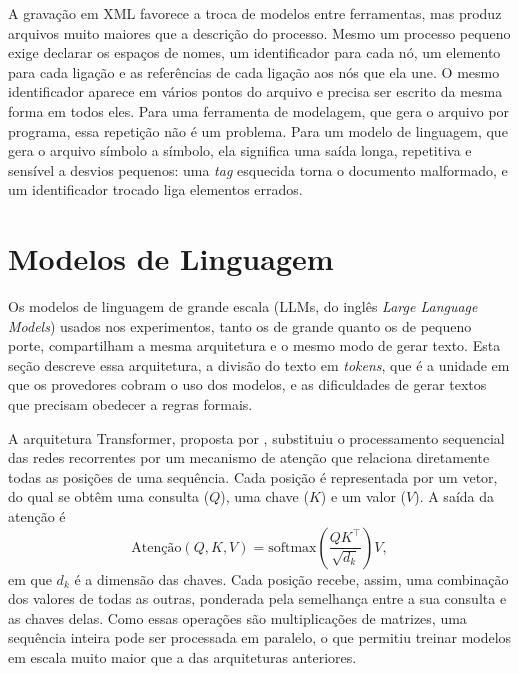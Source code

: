 A gravação em XML favorece a troca de modelos entre ferramentas, mas produz arquivos muito maiores que a descrição do processo. Mesmo um processo pequeno exige declarar os espaços de nomes, um identificador para cada nó, um elemento para cada ligação e as referências de cada ligação aos nós que ela une. O mesmo identificador aparece em vários pontos do arquivo e precisa ser escrito da mesma forma em todos eles. Para uma ferramenta de modelagem, que gera o arquivo por programa, essa repetição não é um problema. Para um modelo de linguagem, que gera o arquivo símbolo a símbolo, ela significa uma saída longa, repetitiva e sensível a desvios pequenos: uma \textit{tag} esquecida torna o documento malformado, e um identificador trocado liga elementos errados.

\section{Modelos de Linguagem}
\label{sec:llms}\label{subsec:transformer}\label{subsec:tokenizacao}\label{subsec:saidas-estruturadas}

Os modelos de linguagem de grande escala (LLMs, do inglês \textit{Large Language Models}) usados nos experimentos, tanto os de grande quanto os de pequeno porte, compartilham a mesma arquitetura e o mesmo modo de gerar texto. Esta seção descreve essa arquitetura, a divisão do texto em \textit{tokens}, que é a unidade em que os provedores cobram o uso dos modelos, e as dificuldades de gerar textos que precisam obedecer a regras formais.

A arquitetura Transformer, proposta por , substituiu o processamento sequencial das redes recorrentes por um mecanismo de atenção que relaciona diretamente todas as posições de uma sequência. Cada posição é representada por um vetor, do qual se obtêm uma consulta ($Q$), uma chave ($K$) e um valor ($V$). A saída da atenção é
\begin{equation}
	\text{Atenção}(Q, K, V) = \text{softmax}\left(\frac{QK^{\top}}{\sqrt{d_k}}\right) V,
\end{equation}
em que $d_k$ é a dimensão das chaves. Cada posição recebe, assim, uma combinação dos valores de todas as outras, ponderada pela semelhança entre a sua consulta e as chaves delas. Como essas operações são multiplicações de matrizes, uma sequência inteira pode ser processada em paralelo, o que permitiu treinar modelos em escala muito maior que a das arquiteturas anteriores.

